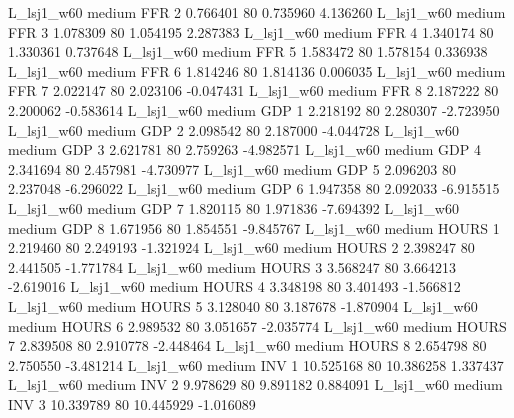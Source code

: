     L_lsj1_w60     medium      FFR                 2  0.766401 80       0.735960           4.136260
    L_lsj1_w60     medium      FFR                 3  1.078309 80       1.054195           2.287383
    L_lsj1_w60     medium      FFR                 4  1.340174 80       1.330361           0.737648
    L_lsj1_w60     medium      FFR                 5  1.583472 80       1.578154           0.336938
    L_lsj1_w60     medium      FFR                 6  1.814246 80       1.814136           0.006035
    L_lsj1_w60     medium      FFR                 7  2.022147 80       2.023106          -0.047431
    L_lsj1_w60     medium      FFR                 8  2.187222 80       2.200062          -0.583614
    L_lsj1_w60     medium      GDP                 1  2.218192 80       2.280307          -2.723950
    L_lsj1_w60     medium      GDP                 2  2.098542 80       2.187000          -4.044728
    L_lsj1_w60     medium      GDP                 3  2.621781 80       2.759263          -4.982571
    L_lsj1_w60     medium      GDP                 4  2.341694 80       2.457981          -4.730977
    L_lsj1_w60     medium      GDP                 5  2.096203 80       2.237048          -6.296022
    L_lsj1_w60     medium      GDP                 6  1.947358 80       2.092033          -6.915515
    L_lsj1_w60     medium      GDP                 7  1.820115 80       1.971836          -7.694392
    L_lsj1_w60     medium      GDP                 8  1.671956 80       1.854551          -9.845767
    L_lsj1_w60     medium    HOURS                 1  2.219460 80       2.249193          -1.321924
    L_lsj1_w60     medium    HOURS                 2  2.398247 80       2.441505          -1.771784
    L_lsj1_w60     medium    HOURS                 3  3.568247 80       3.664213          -2.619016
    L_lsj1_w60     medium    HOURS                 4  3.348198 80       3.401493          -1.566812
    L_lsj1_w60     medium    HOURS                 5  3.128040 80       3.187678          -1.870904
    L_lsj1_w60     medium    HOURS                 6  2.989532 80       3.051657          -2.035774
    L_lsj1_w60     medium    HOURS                 7  2.839508 80       2.910778          -2.448464
    L_lsj1_w60     medium    HOURS                 8  2.654798 80       2.750550          -3.481214
    L_lsj1_w60     medium      INV                 1 10.525168 80      10.386258           1.337437
    L_lsj1_w60     medium      INV                 2  9.978629 80       9.891182           0.884091
    L_lsj1_w60     medium      INV                 3 10.339789 80      10.445929          -1.016089
